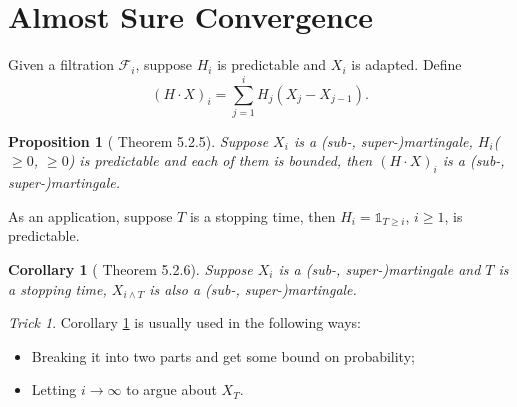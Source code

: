 \documentclass[openany]{book}
\newtheorem{corollary}{Corollary}[chapter]
\newtheorem{proposition}{Proposition}[chapter]
\theoremstyle{definition}
\theoremstyle{remark}
\newtheorem*{trick}{Trick}
\begin{document}
\section{Almost Sure Convergence}
Given a filtration $\mathcal{F}_i$, suppose $H_i$ is predictable and $X_i$ is adapted. Define
\begin{equation*}
    (H\cdot X)_i=\sum_{j=1}^{i}H_j(X_j-X_{j-1}).
\end{equation*}
\begin{proposition}[\cite{D10} Theorem 5.2.5]
    Suppose $X_i$ is a (sub-, super-)martingale, $H_i$($\ge0$, $\ge0$) is predictable and each of them is bounded, then $(H\cdot X)_i$ is a (sub-, super-)martingale.
\end{proposition}
As an application, suppose $T$ is a stopping time, then $H_i=\mathds{1}_{T\ge i}$, $i\ge1$, is predictable.
\begin{corollary}[\cite{D10} Theorem 5.2.6]\label{cor:boundedTime}
    Suppose $X_i$ is a (sub-, super-)martingale and $T$ is a stopping time, $X_{i\wedge T}$ is also a (sub-, super-)martingale.
\end{corollary}
\begin{trick}
    Corollary \ref{cor:boundedTime} is usually used in the following ways:
    \begin{itemize}
        \item Breaking it into two parts and get some bound on probability;
        \item Letting $i\to\infty$ to argue about $X_T$.
    \end{itemize}
\end{trick}
\end{document}
